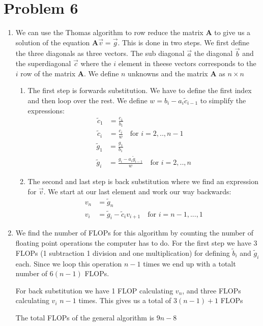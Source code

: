 \documentclass[english,notitlepage]{revtex4-1}  %
\begin{document}
\section*{Problem 6}
\begin{enumerate}[label= \alph*)]
  \item We can use the Thomas algorithm to row reduce the matrix $\boldsymbol{A}$ to give us a solution of the equation $\boldsymbol{A} \vec{v} = \vec{g}$. This is done in two steps. We first define the three diagonals as three vectors. The sub diagonal $\vec{a}$ the diagonal $\vec{b}$ and the superdiagonal $\vec{c}$ where the $i$ element in theese vectors corresponds to the $i$ row of the matrix $\boldsymbol{A}$. We define $n$ unknowns and the matrix $\boldsymbol{A}$ as $n\times n$
  \begin{enumerate}[label=\roman*)]
    \item The first step is forwards substitution. We have to define the first index and then loop over the rest. We define $w = b_i - a_i \tilde{c}_{i-1} $ to simplify the expressions:
    \begin{align*}
      \tilde{c}_1 &= \frac{c_1}{b_1} \\
      \tilde{c}_i &= \frac{c_i}{w} \quad  \text{for }i=2,..,n-1 \quad
    \end{align*}
    \begin{align*}
      \tilde{g}_1 &= \frac{g_1}{b_1} \\
      \tilde{g}_i &= \frac{g_i - a_i \tilde{g}_{i-1}}{w} \quad \text{for }i=2,..,n
    \end{align*}
    \item The second and last step is back substitution where we find an expression for $\vec{v}$. We start at our last element and work our way backwards:
    \begin{align*}
      v_n &= \tilde{g}_n \\
      v_i &= \tilde{g}_i - \tilde{c}_i v_ {i+1} \quad \text{for } i = n-1,...,1
    \end{align*}
  \end{enumerate}
  \item We find the number of FLOPs for this algorithm by counting the number of floating point operations the computer has to do. For the first step we have 3 FLOPs (1 subtraction 1 division and one multiplication) for defining $\tilde{b}_i$ and  $\tilde{g}_i$ each. Since we loop this operation $n-1$ times we end up with a  totalt number of $6(n-1)$ FLOPs.

  For back substitution we have 1 FLOP calculating $v_n$, and three FLOPs calculating $v_i$ $n-1$ times. This gives us a total of $3(n-1)+1$ FLOPs

  The total FLOPs of the general algorithm is $9n-8$
\end{enumerate}
\end{document}
